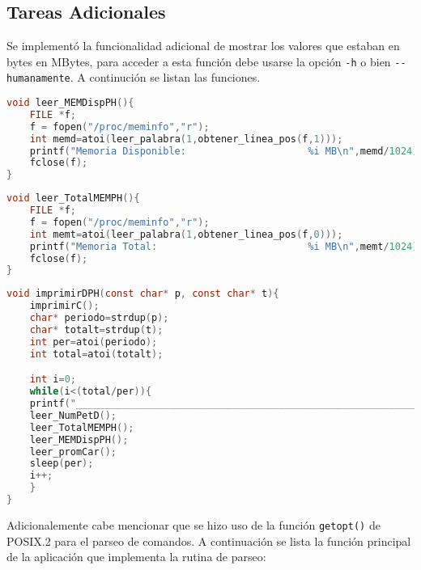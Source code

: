 \documentclass{article}
\begin{document}
\subsection{Tareas Adicionales}
Se implementó la funcionalidad adicional de mostrar los valores que estaban en bytes en MBytes, para acceder a esta función debe usarse la opción \verb+-h+ o bien \verb+--humanamente+. A continución se listan las funciones.

{\fontfamily{\ttdefault}\selectfont
\begin{lstlisting}[language=c,caption=Función leer\_MEMDispPH()., breaklines=true] 
void leer_MEMDispPH(){
	FILE *f;
	f = fopen("/proc/meminfo","r");
	int memd=atoi(leer_palabra(1,obtener_linea_pos(f,1)));
	printf("Memoria Disponible:                     %i MB\n",memd/1024);
	fclose(f);
}
\end{lstlisting}}


{\fontfamily{\ttdefault}\selectfont
\begin{lstlisting}[language=c,caption=Función leer\_TotalMEMPH()., breaklines=true] 
void leer_TotalMEMPH(){
	FILE *f;
	f = fopen("/proc/meminfo","r");
	int memt=atoi(leer_palabra(1,obtener_linea_pos(f,0)));
	printf("Memoria Total:                          %i MB\n",memt/1024);
	fclose(f);
}
\end{lstlisting}}


{\fontfamily{\ttdefault}\selectfont
\begin{lstlisting}[language=c,caption=Función imprimirDPH()., breaklines=true] 
void imprimirDPH(const char* p, const char* t){
	imprimirC();
	char* periodo=strdup(p);
	char* totalt=strdup(t);
	int per=atoi(periodo);
	int total=atoi(totalt);

	int i=0;
	while(i<(total/per)){	
	printf("____________________________________________________________\n");
	leer_NumPetD();
	leer_TotalMEMPH();
	leer_MEMDispPH();
	leer_promCar();
	sleep(per);
	i++;
	}
}
\end{lstlisting}}
Adicionalemente cabe mencionar que se hizo uso de la función \verb+getopt()+ de POSIX.2 para el parseo de comandos. A continuación se lista la función principal de la aplicación que implementa la rutina de parseo:
\end{document}
